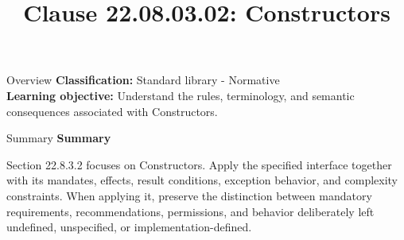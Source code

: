 \documentclass[10pt,letterpaper]{article}
\title{Clause 22.08.03.02: Constructors}
\author{}
\date{}
\begin{document}
\maketitle
\begin{CornellOverviewBox}{Overview}
\textbf{Classification:} Standard library - Normative\\[2pt]
\textbf{Learning objective:} Understand the rules, terminology, and semantic consequences associated with Constructors.
\end{CornellOverviewBox}\begin{CornellSummaryBox}{Summary}
{\sffamily\bfseries\color{Accent} Summary}\par\vspace{3pt}Section 22.8.3.2 focuses on Constructors. Apply the specified interface together with its mandates, effects, result conditions, exception behavior, and complexity constraints. When applying it, preserve the distinction between mandatory requirements, recommendations, permissions, and behavior deliberately left undefined, unspecified, or implementation-defined.
\end{CornellSummaryBox}
\end{document}
